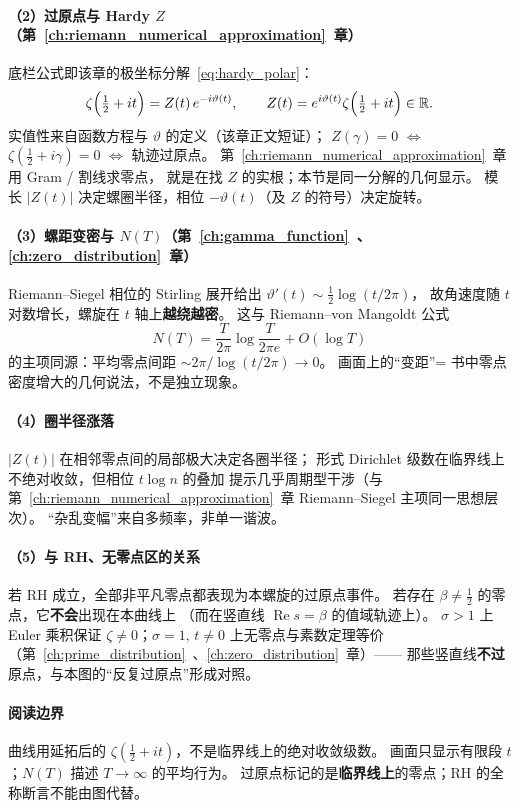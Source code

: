 \paragraph{（2）过原点与 Hardy $Z$（第~\ref{ch:riemann_numerical_approximation}~章）}
底栏公式即该章的极坐标分解~\eqref{eq:hardy_polar}：
\[
\zeta\Bigl(\tfrac12+it\Bigr)
=Z(t)\,e^{-i\vartheta(t)},
\qquad
Z(t)=e^{i\vartheta(t)}\zeta\Bigl(\tfrac12+it\Bigr)\in\mathbb{R}.
\]
实值性来自函数方程与 $\vartheta$ 的定义（该章正文短证）；
$Z(\gamma)=0$ $\Leftrightarrow$ $\zeta(\frac12+i\gamma)=0$ $\Leftrightarrow$ 轨迹过原点。
第~\ref{ch:riemann_numerical_approximation}~章用 Gram / 割线求零点，
就是在找 $Z$ 的实根；本节是同一分解的几何显示。
模长 $|Z(t)|$ 决定螺圈半径，相位 $-\vartheta(t)$（及 $Z$ 的符号）决定旋转。

\paragraph{（3）螺距变密与 $N(T)$（第~\ref{ch:gamma_function}~、\ref{ch:zero_distribution}~章）}
Riemann--Siegel 相位的 Stirling 展开给出
$\vartheta'(t)\sim\frac12\log(t/2\pi)$，
故角速度随 $t$ 对数增长，螺旋在 $t$ 轴上\textbf{越绕越密}。
这与 Riemann--von Mangoldt 公式
\[
N(T)=\frac{T}{2\pi}\log\frac{T}{2\pi e}+O(\log T)
\]
的主项同源：平均零点间距 $\sim 2\pi/\log(t/2\pi)\to 0$。
画面上的“变距”= 书中零点密度增大的几何说法，不是独立现象。

\paragraph{（4）圈半径涨落}
$|Z(t)|$ 在相邻零点间的局部极大决定各圈半径；
形式 Dirichlet 级数在临界线上不绝对收敛，但相位 $t\log n$ 的叠加
提示几乎周期型干涉（与第~\ref{ch:riemann_numerical_approximation}~章
Riemann--Siegel 主项同一思想层次）。
“杂乱变幅”来自多频率，非单一谐波。

\paragraph{（5）与 RH、无零点区的关系}
若 RH 成立，全部非平凡零点都表现为本螺旋的过原点事件。
若存在 $\beta\neq\frac12$ 的零点，它\textbf{不会}出现在本曲线上
（而在竖直线 $\operatorname{Re}s=\beta$ 的值域轨迹上）。
$\sigma>1$ 上 Euler 乘积保证 $\zeta\neq 0$；$\sigma=1,\,t\neq 0$ 上无零点与素数定理等价
（第~\ref{ch:prime_distribution}~、\ref{ch:zero_distribution}~章）——
那些竖直线\textbf{不过}原点，与本图的“反复过原点”形成对照。

\paragraph{阅读边界}
曲线用延拓后的 $\zeta(\frac12+it)$，不是临界线上的绝对收敛级数。
画面只显示有限段 $t$；$N(T)$ 描述 $T\to\infty$ 的平均行为。
过原点标记的是\textbf{临界线上}的零点；RH 的全称断言不能由图代替。


